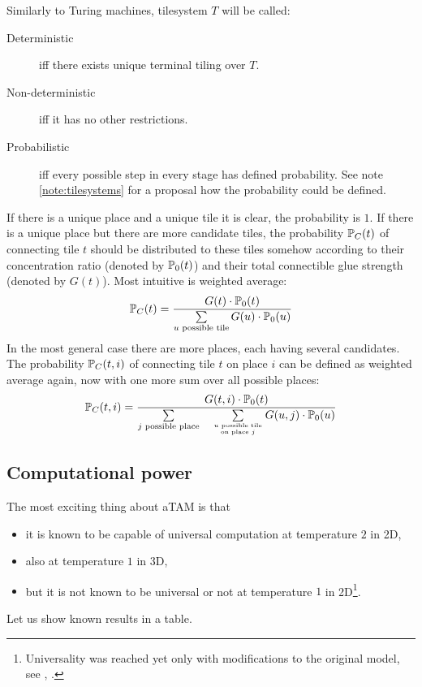 	Similarly to Turing machines, tilesystem $T$ will be called:
	\begin{description}
		\item[Deterministic] iff there exists unique terminal tiling over $T$. %
		\item[Non-deterministic] iff it has no other restrictions. %
		\item[Probabilistic] iff every possible step in every stage has defined probability. See note \ref{note:tilesystems} for a proposal how the probability could be defined.
	\end{description}
	
	\begin{note}\label{note:tilesystems}
		If there is a unique place and a unique tile it is clear, the probability is $1$. If there is a unique place but there are more candidate tiles, the probability $\mathbb{P}_C(t)$ of connecting tile $t$ should be distributed to these tiles somehow according to their concentration ratio (denoted by $\mathbb{P}_0(t)$) and their total connectible glue strength (denoted by $G(t)$). Most intuitive is weighted average:
		\begin{equation*}
			\mathbb{P}_C(t) = \frac{G(t)\cdot\mathbb{P}_0(t)}{\sum\limits_{u\textnormal{ possible tile}}G(u)\cdot\mathbb{P}_0(u)}
		\end{equation*}
		In the most general case there are more places, each having several candidates. The probability $\mathbb{P}_C(t,i)$ of connecting tile $t$ on place $i$ can be defined as weighted average again, now with one more sum over all possible places:
		\begin{equation*}
			\mathbb{P}_C(t,i) = \frac{G(t,i)\cdot\mathbb{P}_0(t)}{\sum\limits_{j\textnormal{ possible place}}\quad\sum\limits_{u\textnormal{ possible tile}\atop\textnormal{on place }j}G(u,j)\cdot\mathbb{P}_0(u)}
		\end{equation*}
	\end{note}

\subsection{Computational power}\label{sec:wang_power}
	
	The most exciting thing about aTAM is that
	\begin{itemize}
		\item it is known to be capable of universal computation at temperature $2$ in 2D,
		\item also at temperature $1$ in 3D,
		\item but it is not known to be universal or not at temperature $1$ in 2D\footnote{Universality was reached yet only with modifications to the original model, see \cite{stage_assembly}, \cite{active_tiles}.}.
	\end{itemize}
	Let us show known results in a table.
	
